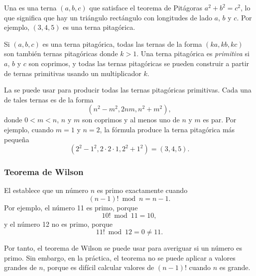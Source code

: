 Una  es una terna $(a,b,c)$
que satisface el teorema de Pitágoras
$a^2+b^2=c^2$, lo que significa que hay un triángulo rectángulo
con longitudes de lado $a$, $b$ y $c$.
Por ejemplo, $(3,4,5)$ es una terna pitagórica.

Si $(a,b,c)$ es una terna pitagórica,
todas las ternas de la forma $(ka,kb,kc)$
son también ternas pitagóricas donde $k>1$.
Una terna pitagórica es \emph{primitiva} si
$a$, $b$ y $c$ son coprimos,
y todas las ternas pitagóricas se pueden construir
a partir de ternas primitivas usando un multiplicador $k$.

La  se puede usar para producir
todas las ternas pitagóricas primitivas.
Cada una de tales ternas es de la forma
\[(n^2-m^2,2nm,n^2+m^2),\]
donde $0<m<n$, $n$ y $m$ son coprimos
y al menos uno de $n$ y $m$ es par.
Por ejemplo, cuando $m=1$ y $n=2$, la fórmula
produce la terna pitagórica más pequeña
\[(2^2-1^2,2\cdot2\cdot1,2^2+1^2)=(3,4,5).\]

\subsubsection{Teorema de Wilson}


El 
establece que un número $n$
es primo exactamente cuando
\[(n-1)! \bmod n = n-1.\]
Por ejemplo, el número 11 es primo, porque
\[10! \bmod 11 = 10,\]
y el número 12 no es primo, porque
\[11! \bmod 12 = 0 \neq 11.\]

Por tanto, el teorema de Wilson se puede usar para averiguar
si un número es primo. Sin embargo, en la práctica, el teorema no se puede
aplicar a valores grandes de $n$, porque es difícil
calcular valores de $(n-1)!$ cuando $n$ es grande.

